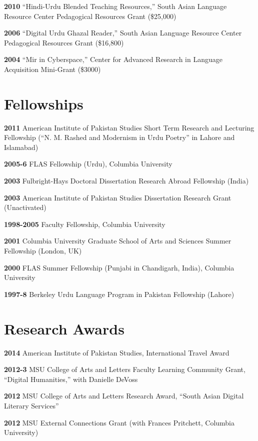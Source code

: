 \documentclass[letterpaper,12pt]{article}
\begin{document}
\textbf{2010}
“Hindi-Urdu Blended Teaching Resources,”
South Asian Language Resource Center Pedagogical Resources Grant (\$25,000)

\textbf{2006}
“Digital Urdu Ghazal Reader,”
South Asian Language Resource Center Pedagogical Resources Grant (\$16,800)

\textbf{2004}
“Mir in Cyberspace,”
Center for Advanced Research in Language Acquisition Mini-Grant (\$3000)


\section{Fellowships%
  \label{fellowships}%
}

\textbf{2011}
American Institute of Pakistan Studies
Short Term Research and Lecturing Fellowship
(“N. M. Rashed and Modernism in Urdu Poetry” in Lahore and Islamabad)

\textbf{2005-6}
FLAS Fellowship (Urdu), Columbia University

\textbf{2003}
Fulbright-Hays Doctoral Dissertation Research Abroad Fellowship (India)

\textbf{2003}
American Institute of Pakistan Studies Dissertation Research Grant (Unactivated)

\textbf{1998-2005}
Faculty Fellowship, Columbia University

\textbf{2001}
Columbia University Graduate School of Arts and Sciences Summer Fellowship (London, UK)

\textbf{2000}
FLAS Summer Fellowship (Punjabi in Chandigarh, India), Columbia University

\textbf{1997-8}
Berkeley Urdu Language Program in Pakistan Fellowship (Lahore)


\section{Research Awards%
  \label{research-awards}%
}

\textbf{2014}
American Institute of Pakistan Studies, International Travel Award

\textbf{2012-3}
MSU College of Arts and Letters Faculty Learning Community Grant,
“Digital Humanities,” with Danielle DeVoss

\textbf{2012}
MSU College of Arts and Letters Research Award,
“South Asian Digital Literary Services”

\textbf{2012}
MSU External Connections Grant (with Frances Pritchett, Columbia University)
\end{document}
